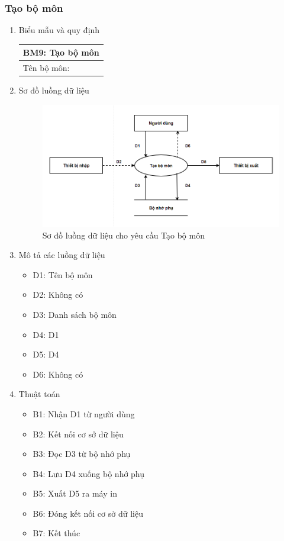 \documentclass[a4paper]{article}
\begin{document}
				\subsubsection{Tạo bộ môn}	
				\begin{enumerate}
\item Biểu mẫu và quy định

\begin{table}[H]
\centering
\renewcommand{\arraystretch}{1.5}
\setlength{\tabcolsep}{15pt}
\begin{tabular}{|p{10cm}|}
\hline
\multicolumn{1}{|c|}{\textbf{BM9: Tạo bộ môn}} \\  %
\hline
Tên bộ môn: \dotfill \\  
\hline
\end{tabular}
\end{table}


\item Sơ đồ luồng dữ liệu
\begin{figure}[H] 
    \centering
    \includegraphics[width=1\textwidth]{dfd9} %
    \caption{Sơ đồ luồng dữ liệu cho yêu cầu Tạo bộ môn}
\end{figure}
\item Mô tả các luồng dữ liệu
\begin{itemize}
\item D1: Tên bộ môn
\item D2: Không có
\item D3: Danh sách bộ môn
\item D4: D1
\item D5: D4
\item D6: Không có
\end{itemize}
\item Thuật toán
\begin{itemize}
\item B1: Nhận D1 từ người dùng
\item B2: Kết nối cơ sở dữ liệu
\item B3: Đọc D3 từ bộ nhớ phụ
\item B4: Lưu D4 xuống bộ nhớ phụ
\item B5: Xuất D5 ra máy in
\item B6: Đóng kết nối cơ sở dữ liệu
\item B7: Kết thúc
\end{itemize}
\end{enumerate}	
\end{document}

